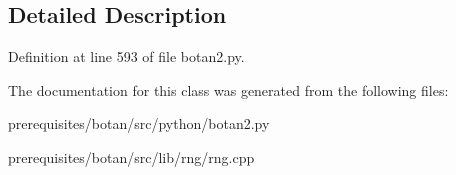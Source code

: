 \subsection{Detailed Description}


Definition at line 593 of file botan2.\+py.



The documentation for this class was generated from the following files\+:\begin{DoxyCompactItemize}
\item 
prerequisites/botan/src/python/botan2.\+py\item 
prerequisites/botan/src/lib/rng/rng.\+cpp\end{DoxyCompactItemize}
